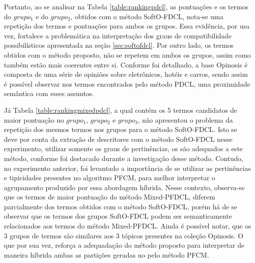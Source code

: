 Portanto, ao se analisar na Tabela \ref{table:rankingpdcl}, as pontuações e os termos do $grupo_1$ e
do $grupo_2$, obtidos com o método SoftO-FDCL, nota-se uma repetição dos termos e pontuações para
ambos os grupos. Essa evidência, por usa vez, fortalece a problemática na interpretação dos graus de
compatibilidade possibilísticos apresentada na seção \ref{sec:softofdcl}.  Por outro lado, os termos
obtidos com o método proposto, não se repetem em ambos os grupos, assim como também estão mais
coerentes entre si. Conforme foi detalhado, a base Opinosis é composta de uma série de opiniões
sobre eletrônicos, hotéis e carros, sendo assim é possível observar nos termos encontrados pelo
método PDCL, uma proximidade semântica com esses assuntos.

Já Tabela \ref{table:rankingmixedpdcl}, a qual contém os 5 termos candidatos de maior pontuação no 
$grupo_1$, $grupo_2$ e $grupo_3$, não apresentou o problema da repetição dos mesmos termos nos
grupos para o método SoftO-FDCL. Isto se deve por conta da extração de descritores com o método
SoftO-FDCL nesse experimento, utilizar somente os graus de pertinências, os são adequados a este
método, conforme foi destacado durante a investigação desse método. Contudo, no experimento
anterior, foi levantado a importância de se utilizar as pertinências e tipicidades presentes no
algoritmo PFCM, para melhor interpretar o agrupamento produzido por essa abordagem híbrida. Nesse
contexto, observa-se que os termos de maior pontuação do método Mixed-PFDCL, diferem parcialmente
dos termos obtidos com o método SoftO-FDCL, porém há de se observar que os termos dos grupos
SoftO-FDCL podem ser semanticamente relacionados aos termos do método Mixed-PFDCL. Ainda é possível
notar, que os 3 grupos de termos são similares aos 3 tópicos presentes na coleção Opinosis. O que
por sua vez, reforça a adequadação do método proposto para interpretar de maneira híbrida ambas as
partições geradas no pelo método PFCM.

